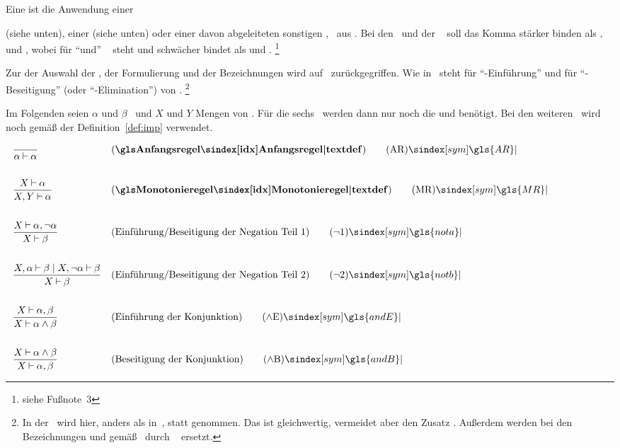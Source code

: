 Eine  ist die Anwendung einer \emph{\Substitution}{ (siehe unten), einer \emph{\Basisregel} (siehe unten) oder einer davon abgeleiteten sonstigen \emph{\Schlussregel}, \textzB\ aus .
Bei den \Schlussregeln\ und der \Substitution\ \chrqt{\symsubst} soll das Komma stärker binden als \chrqt{\symderive}, \chrqt{\symsubst} und \chrqt{\symsrand}, wobei \chrqt{\symsrand} für \enquote{und} \textbzw\ \chrqt{\symmetaand} steht und schwächer bindet als \chrqt{\symderive} und \chrqt{\symsubst}.%
\footnote{siehe Fußnote~3 }

Zur der Auswahl der \Basisregeln, der Formulierung und der Bezeichnungen wird auf~\cite{bib:Rautenberg,bib:NatuerlichesSchliessen} zurückgegriffen.
Wie in~\cite{bib:NatuerlichesSchliessen} steht  für \enquote{-Einführung} und  für \enquote{-Beseitigung} (oder \enquote{-Elimination}) von \Junktoren.%
\footnote{%
	In der \Monotonieregel\ wird hier, anders als in~\cite{bib:Rautenberg},  statt  genommen. Das ist gleichwertig, vermeidet aber den Zusatz .
	Außerdem werden bei den Bezeichnungen  und  gemäß~\cite{bib:NatuerlichesSchliessen} durch \seqqt{$(\andE)$} \textbzw\ \seqqt{$(\andB)$} ersetzt.
}

Im Folgenden seien $\alpha$ und $\beta$ \Formeln\ und $X$ und $Y$ Mengen von \Formeln.
Für die sechs \Basisregeln\ werden dann nur noch die \Junktoren \chrqt{\symlnot} und \chrqt{\symland} benötigt.
Bei den weiteren \Schlussregeln\ wird noch \chrqt{\symlimp} gemäß der Definition~\vref{def:imp} verwendet.

\begin{align}
	& \frac{}{\alpha\derive\alpha}
	& & (\text{\definition{\Anfangsregel}})
	\tag{\AR} \sym{\gls{AR}} \label{def:Anfangsregel}
	\\\\
	& \frac{X\derive\alpha}{X,Y\derive\alpha}
	& & (\text{\definition{\Monotonieregel}})
	\tag{\MR} \sym{\gls{MR}} \label{def:Monotonieregel}
	\\\\
	& \frac{X\derive\alpha,\lnot\alpha}{X\derive\beta}
	& & (\text{Einführung/Beseitigung der Negation Teil 1})
	\tag{\nota} \sym{\gls{nota}} \label{def:nota}
	\\\\
	& \frac{X,\alpha\derive\beta \srand X,\lnot\alpha\derive\beta}{X\derive\beta}
	& & (\text{Einführung/Beseitigung der Negation Teil 2})
	\tag{\notb} \sym{\gls{notb}} \label{def:notb}
	\\\\
	& \frac{X\derive\alpha,\beta}{X\derive\alpha\land\beta}
	& & (\text{Einführung der Konjunktion})
	\tag{\andE} \sym{\gls{andE}} \label{def:andE}
	\\\\
	& \frac{X\derive\alpha\land\beta}{X\derive\alpha,\beta}
	& & (\text{Beseitigung der Konjunktion})
	\tag{\andB} \sym{\gls{andB}} \label{def:andB}
	\formulatoleft
\end{align}

}
